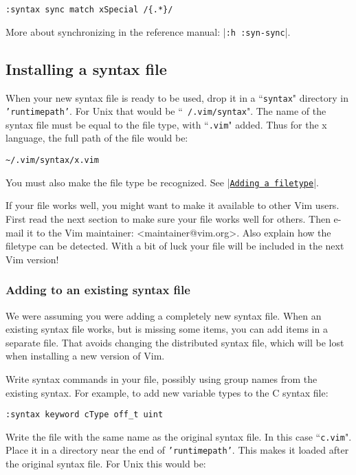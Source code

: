 \begin{Verbatim}[samepage=true]
 :syntax sync match xSpecial /{.*}/
\end{Verbatim}

More about synchronizing in the reference manual: |\texttt{:h :syn-sync}|.
\subsection{Installing a syntax file}
When your new syntax file is ready to be used, drop it in a ``\texttt{syntax}" directory in \texttt{'runtimepath'}.
For Unix that would be ``\texttt{~/.vim/syntax}".
The name of the syntax file must be equal to the file type, with ``\texttt{.vim}" added.
Thus for the x language, the full path of the file would be:

\begin{Verbatim}[samepage=true]
    ~/.vim/syntax/x.vim
\end{Verbatim}

You must also make the file type be recognized.
See |\hyperref[Adding a filetype]{\texttt{Adding a filetype}}|.

If your file works well, you might want to make it available to other Vim users.
First read the next section to make sure your file works well for others. Then e-mail it to the Vim maintainer: <maintainer@vim.org>. Also explain how the filetype can be detected.
With a bit of luck your file will be included in the next Vim version!

\subsubsection{Adding to an existing syntax file}
We were assuming you were adding a completely new syntax file.
When an existing syntax file works, but is missing some items, you can add items in a separate file.
That avoids changing the distributed syntax file, which will be lost when installing a new version of Vim.

Write syntax commands in your file, possibly using group names from the existing syntax.
For example, to add new variable types to the C syntax file:

\begin{Verbatim}[samepage=true]
 :syntax keyword cType off_t uint
\end{Verbatim}

Write the file with the same name as the original syntax file.
In this case ``\texttt{c.vim}".
Place it in a directory near the end of \texttt{'runtimepath'}.
This makes it loaded after the original syntax file.
For Unix this would be:

